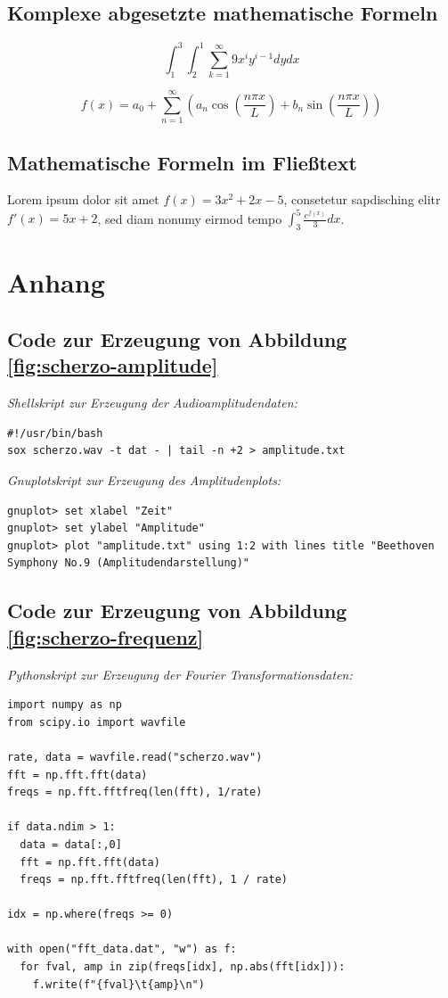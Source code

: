 \documentclass[paper=a4,fontsize=12pt,ngerman]{scrartcl}
\begin{document}
\subsection{Komplexe abgesetzte mathematische Formeln}

$$\int_1^3{\int_2^1 \sum_{k=1}^{\infty} 9x^iy^{i-1} dydx}$$

$$f(x) = a_0 + \sum_{n=1}^{\infty} (a_n\cos(\frac{n\pi x}{L}) + b_n\sin(\frac{n\pi x}{L}))$$

\subsection{Mathematische Formeln im Fließtext}

Lorem ipsum dolor sit amet $f(x) = 3x^2 + 2x - 5$, consetetur sapdisching elitr $f'(x)=5x+2$, sed diam nonumy eirmod tempo $\int_3^5 \frac{e^{f(x)}}{3} dx$.

\section{Anhang}

\subsection{Code zur Erzeugung von Abbildung \ref{fig:scherzo-amplitude}}

\textit{Shellskript zur Erzeugung der Audioamplitudendaten:}
\begin{lstlisting}
#!/usr/bin/bash
sox scherzo.wav -t dat - | tail -n +2 > amplitude.txt
\end{lstlisting}

\textit{Gnuplotskript zur Erzeugung des Amplitudenplots:}
\begin{lstlisting}
gnuplot> set xlabel "Zeit"
gnuplot> set ylabel "Amplitude"
gnuplot> plot "amplitude.txt" using 1:2 with lines title "Beethoven Symphony No.9 (Amplitudendarstellung)"
\end{lstlisting}

\subsection{Code zur Erzeugung von Abbildung \ref{fig:scherzo-frequenz}}

\textit{Pythonskript zur Erzeugung der Fourier Transformationsdaten:}
\begin{lstlisting}
import numpy as np 
from scipy.io import wavfile

rate, data = wavfile.read("scherzo.wav")
fft = np.fft.fft(data)
freqs = np.fft.fftfreq(len(fft), 1/rate)

if data.ndim > 1:
  data = data[:,0]
  fft = np.fft.fft(data)
  freqs = np.fft.fftfreq(len(fft), 1 / rate)

idx = np.where(freqs >= 0)

with open("fft_data.dat", "w") as f:
  for fval, amp in zip(freqs[idx], np.abs(fft[idx])):
    f.write(f"{fval}\t{amp}\n")
\end{lstlisting}
\end{document}
